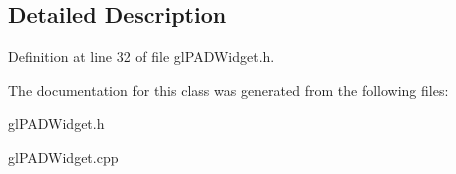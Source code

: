 \subsection{\-Detailed \-Description}


\-Definition at line 32 of file gl\-P\-A\-D\-Widget.\-h.



\-The documentation for this class was generated from the following files\-:\begin{DoxyCompactItemize}
\item 
gl\-P\-A\-D\-Widget.\-h\item 
gl\-P\-A\-D\-Widget.\-cpp\end{DoxyCompactItemize}
